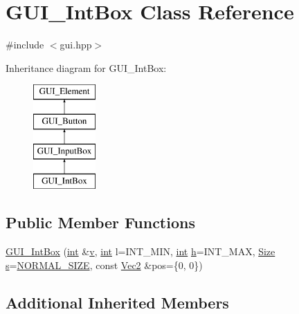 \hypertarget{class_g_u_i___int_box}{\section{G\-U\-I\-\_\-\-Int\-Box Class Reference}
\label{class_g_u_i___int_box}
}


{\ttfamily \#include $<$gui.\-hpp$>$}

Inheritance diagram for G\-U\-I\-\_\-\-Int\-Box\-:\begin{figure}[H]
\begin{center}
\leavevmode
\includegraphics[height=4.000000cm]{class_g_u_i___int_box}
\end{center}
\end{figure}
\subsection*{Public Member Functions}
\begin{DoxyCompactItemize}
\item 
\hyperlink{class_g_u_i___int_box_af034c5ab72c6611b03ede8f1d71974c1}{G\-U\-I\-\_\-\-Int\-Box} (\hyperlink{_s_d_l__thread_8h_a6a64f9be4433e4de6e2f2f548cf3c08e}{int} \&\hyperlink{_s_d_l__opengl_8h_a10a82eabcb59d2fcd74acee063775f90}{v}, \hyperlink{_s_d_l__thread_8h_a6a64f9be4433e4de6e2f2f548cf3c08e}{int} l=I\-N\-T\-\_\-\-M\-I\-N, \hyperlink{_s_d_l__thread_8h_a6a64f9be4433e4de6e2f2f548cf3c08e}{int} \hyperlink{_s_d_l__opengl__glext_8h_afa0fb1b5e976920c0abeff2dca3ed774}{h}=I\-N\-T\-\_\-\-M\-A\-X, \hyperlink{gui_8hpp_a1c40db1d9b56c27240e420765695f1c4}{Size} \hyperlink{_s_d_l__opengl_8h_a4af680a6c683f88ed67b76f207f2e6e4}{s}=\hyperlink{gui_8hpp_a1c40db1d9b56c27240e420765695f1c4a5ea6a19a48a3ca328c0a05aa8c5ac1af}{N\-O\-R\-M\-A\-L\-\_\-\-S\-I\-Z\-E}, const \hyperlink{class_vec2}{Vec2} \&pos=\{0, 0\})
\end{DoxyCompactItemize}
\subsection*{Additional Inherited Members}


